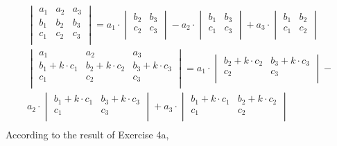 \documentclass{article}
\begin{document}
\begin{gather*}
  \begin{vmatrix}
    a_1 & a_2 & a_3 \\
    b_1 & b_2 & b_3 \\
    c_1 & c_2 & c_3 \\
  \end{vmatrix} = 
  a_1 \cdot \begin{vmatrix}
              b_2 & b_3 \\
              c_2 & c_3 \\ 
            \end{vmatrix} -
  a_2 \cdot \begin{vmatrix}
              b_1 & b_3 \\
              c_1 & c_3 \\
            \end{vmatrix} + 
  a_3 \cdot \begin{vmatrix}
              b_1 & b_2 \\
              c_1 & c_2 \\ 
            \end{vmatrix} \\
  \begin{vmatrix}
    a_1 & a_2 & a_3 \\
    b_1 + k \cdot c_1 & b_2 + k \cdot c_2 & b_3 + k \cdot c_3 \\
    c_1 & c_2 & c_3 \\
  \end{vmatrix} = 
  a_1 \cdot \begin{vmatrix}
              b_2 + k \cdot c_2 & b_3 + k \cdot c_3 \\
              c_2 & c_3 \\ 
            \end{vmatrix} - \\
  a_2 \cdot \begin{vmatrix}
              b_1 + k \cdot c_1 & b_3 + k \cdot c_3 \\
              c_1 & c_3 \\
            \end{vmatrix} + 
  a_3 \cdot \begin{vmatrix}
              b_1 + k \cdot c_1 & b_2 + k \cdot c_2 \\
              c_1 & c_2 \\ 
            \end{vmatrix} \\
\end{gather*}
According to the result of Exercise 4a,
\end{document}

